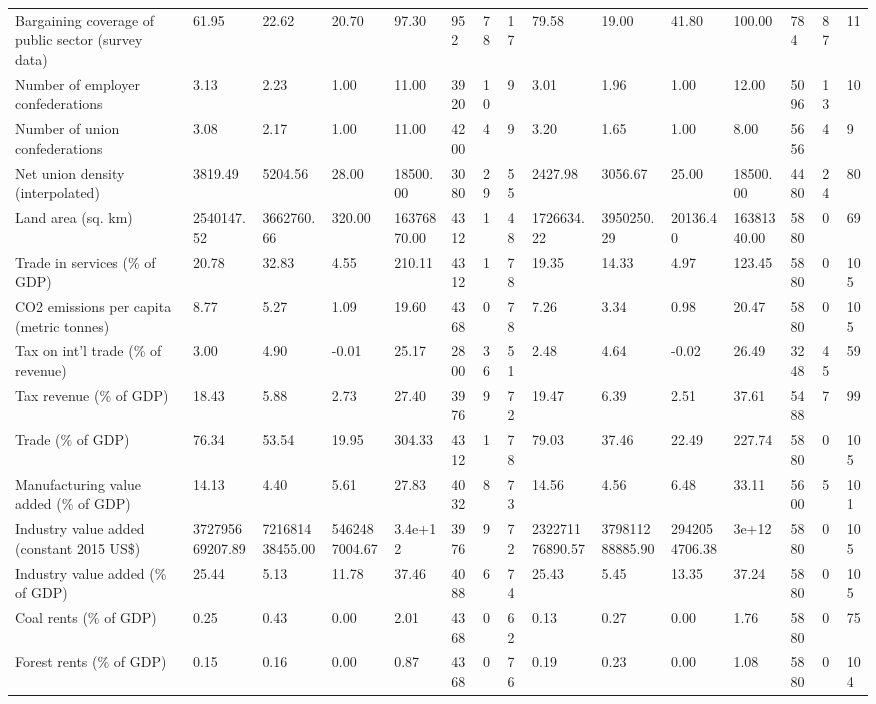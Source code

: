 \begin{longtable}{lllllllllllllll}
\addlinespace
Bargaining coverage of public sector (survey data) & 61.95 & 22.62 & 20.70 & 97.30 & 952 & 78 & 17 & 79.58 & 19.00 & 41.80 & 100.00 & 784 & 87 & 11\\
Number of employer confederations & 3.13 & 2.23 & 1.00 & 11.00 & 3920 & 10 & 9 & 3.01 & 1.96 & 1.00 & 12.00 & 5096 & 13 & 10\\
Number of union confederations & 3.08 & 2.17 & 1.00 & 11.00 & 4200 & 4 & 9 & 3.20 & 1.65 & 1.00 & 8.00 & 5656 & 4 & 9\\
Net union density (interpolated) & 3819.49 & 5204.56 & 28.00 & 18500.00 & 3080 & 29 & 55 & 2427.98 & 3056.67 & 25.00 & 18500.00 & 4480 & 24 & 80\\
Land area (sq. km) & 2540147.52 & 3662760.66 & 320.00 & 16376870.00 & 4312 & 1 & 48 & 1726634.22 & 3950250.29 & 20136.40 & 16381340.00 & 5880 & 0 & 69\\
\addlinespace
Trade in services (\% of GDP) & 20.78 & 32.83 & 4.55 & 210.11 & 4312 & 1 & 78 & 19.35 & 14.33 & 4.97 & 123.45 & 5880 & 0 & 105\\
CO2 emissions per capita (metric tonnes) & 8.77 & 5.27 & 1.09 & 19.60 & 4368 & 0 & 78 & 7.26 & 3.34 & 0.98 & 20.47 & 5880 & 0 & 105\\
Tax on int'l trade (\% of revenue) & 3.00 & 4.90 & -0.01 & 25.17 & 2800 & 36 & 51 & 2.48 & 4.64 & -0.02 & 26.49 & 3248 & 45 & 59\\
Tax revenue (\% of GDP) & 18.43 & 5.88 & 2.73 & 27.40 & 3976 & 9 & 72 & 19.47 & 6.39 & 2.51 & 37.61 & 5488 & 7 & 99\\
Trade (\% of GDP) & 76.34 & 53.54 & 19.95 & 304.33 & 4312 & 1 & 78 & 79.03 & 37.46 & 22.49 & 227.74 & 5880 & 0 & 105\\
\addlinespace
Manufacturing value added (\% of GDP) & 14.13 & 4.40 & 5.61 & 27.83 & 4032 & 8 & 73 & 14.56 & 4.56 & 6.48 & 33.11 & 5600 & 5 & 101\\
Industry value added (constant 2015 US\$) & 372795669207.89 & 721681438455.00 & 5462487004.67 & 3.4e+12 & 3976 & 9 & 72 & 232271176890.57 & 379811288885.90 & 2942054706.38 & 3e+12 & 5880 & 0 & 105\\
Industry value added (\% of GDP) & 25.44 & 5.13 & 11.78 & 37.46 & 4088 & 6 & 74 & 25.43 & 5.45 & 13.35 & 37.24 & 5880 & 0 & 105\\
Coal rents (\% of GDP) & 0.25 & 0.43 & 0.00 & 2.01 & 4368 & 0 & 62 & 0.13 & 0.27 & 0.00 & 1.76 & 5880 & 0 & 75\\
Forest rents (\% of GDP) & 0.15 & 0.16 & 0.00 & 0.87 & 4368 & 0 & 76 & 0.19 & 0.23 & 0.00 & 1.08 & 5880 & 0 & 104\\

\end{longtable}
